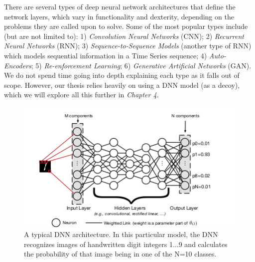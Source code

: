 \documentclass[grad,lot,lof,11pt,oneside,onehalfspace]{RUthesis}
\begin{document}
There are several types of deep neural network architectures that define the network layers, which vary in functionality and dexterity, depending on the problems they are called upon to solve. Some of the most popular types include (but are not limited to): 1) \textit{Convolution Neural Networks} (CNN); 2) \textit{Recurrent Neural Networks} (RNN); 3) \textit{Sequence-to-Sequence Models}  (another type of RNN) which models sequential information in a Time Series sequence; 4) \textit{Auto-Encoders}; 5) \textit{Re-enforcement Learning}; 6) \textit{Generative Artificial Networks} (GAN). We do not spend time going into depth explaining each type as it falls out of scope. However, our thesis relies heavily on using a DNN model (as a decoy), which we will explore all this further in \textit{Chapter 4}. 
\begin{figure}[h]
\centering
\includegraphics[width=0.75\linewidth]{"Images/Chapter 1/DNN"}
\caption{A typical DNN architecture. In this particular model, the DNN recognizes images of handwritten digit integers {1...9} and calculates the probability of that image being in one of the N=10 classes.}
\label{fig:DNN}
\end{figure}
\end{document}
